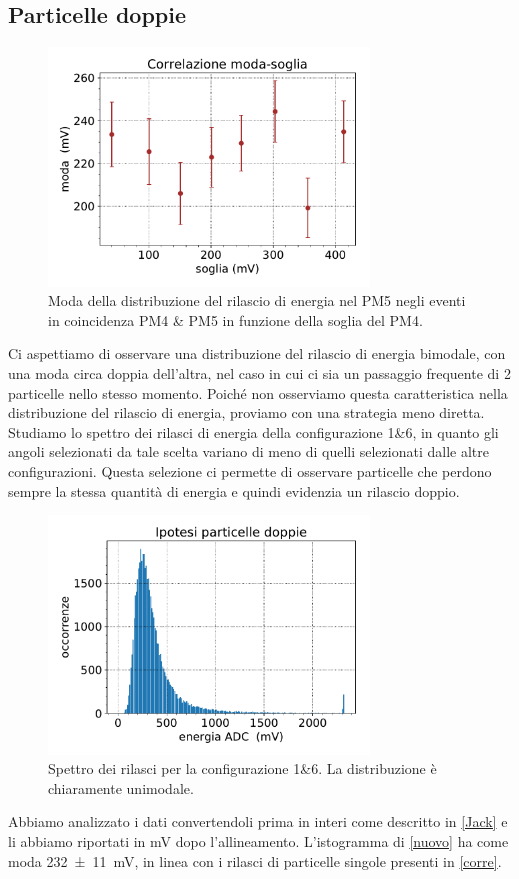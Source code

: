 \subsection{Particelle doppie}

\begin{figure}
	\centering
	\includegraphics[width=23em]{doppie}
	\caption{Moda della distribuzione del rilascio di energia nel PM5
	negli eventi in coincidenza PM4 \& PM5
	in funzione della soglia del PM4.}
	\label{corre}
\end{figure}

Ci aspettiamo di osservare una distribuzione del rilascio di energia bimodale,
con una moda circa doppia dell'altra,
nel caso in cui ci sia un passaggio frequente di 2 particelle nello stesso momento.
Poiché non osserviamo questa caratteristica nella distribuzione del rilascio di energia,
proviamo con una strategia meno diretta.
Studiamo lo spettro dei rilasci di energia della configurazione 1\&6, in quanto gli angoli selezionati da tale scelta variano di meno di quelli selezionati dalle altre configurazioni. Questa selezione ci permette di osservare particelle che perdono sempre la stessa quantità di energia e quindi evidenzia un rilascio doppio.
%
\begin{figure}
	\centering
	\includegraphics[width=23em]{nuovo}
	\caption{Spettro dei rilasci per la configurazione 1\&6. La distribuzione è chiaramente unimodale.}
	\label{nuovo}
\end{figure}
%
Abbiamo analizzato i dati convertendoli prima in interi come descritto in \autoref{Jack} e li abbiamo riportati in \si{mV} dopo l'allineamento.
L'istogramma di \autoref{nuovo} ha come moda \SI{232\pm11}{mV}, in linea con i rilasci di particelle singole presenti in \autoref{corre}. 

